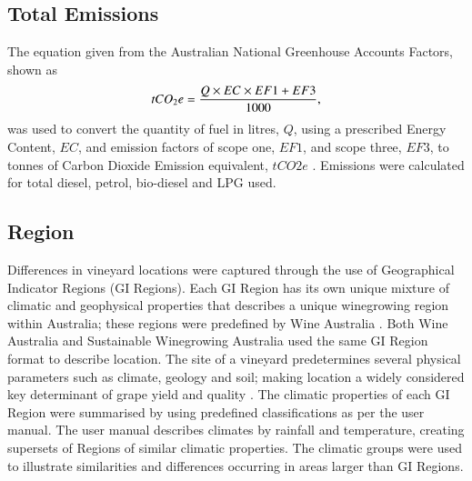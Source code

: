 \documentclass[review,12pt,authoryear]{elsarticle}
\begin{document}
\begin{linenumbers}
\subsection{Total Emissions}
The equation given from the Australian National Greenhouse Accounts Factors, shown as
\newline
\begin{equation}
\label{(1)}
    tCO_{2}e={{Q \times EC \times EF1 + EF3}\over{1000}},
\end{equation}
\newline
was used to convert the quantity of fuel in litres, $Q$, using a prescribed Energy Content, $EC$, and emission factors of scope one, $EF1$, and scope three, $EF3$, to tonnes of Carbon Dioxide Emission equivalent, $tCO2e$ \citep{departmentofclimatechangeenergytheenvironmentandwaterAustralianNationalGreenhouse2022}. Emissions were calculated for total diesel, petrol, bio-diesel and LPG used. 
\subsection{Region}
Differences in vineyard locations were captured through the use of Geographical Indicator Regions (GI Regions). Each GI Region has its own unique mixture of climatic and geophysical properties that describes a unique winegrowing region within Australia; these regions were predefined by Wine Australia \citep{hallidayAustralianWineEncyclopedia2009,oliverReviewSoilPhysical2013,soarClimateDriversRed2008}. Both Wine Australia and Sustainable Winegrowing Australia used the same GI Region format to describe location.
\newline
The site of a vineyard predetermines several physical parameters such as climate, geology and soil; making location a widely considered key determinant of grape yield and quality \citep{abbalDecisionSupportSystem2016,agostaRegionalClimateVariability2012,fragaMultivariateClusteringViticultural2017}. The climatic properties of each GI Region were summarised by using predefined classifications as per the \citet{sustainablewinegrowingaustraliaSustainableWinegrowingAustralia2021} user manual. The user manual describes climates by rainfall and temperature, creating supersets of Regions of similar climatic properties. The climatic groups were used to illustrate similarities and differences occurring in areas larger than GI Regions.

\end{linenumbers}
\end{document}

